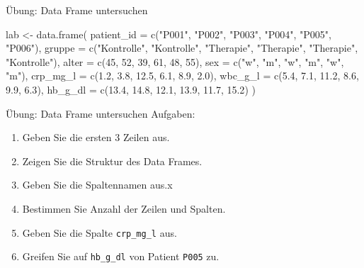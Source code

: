 \documentclass[
  10pt,
  ignorenonframetext,
  aspectratio=169,
]{beamer}
\newenvironment{Shaded}{}{}
\newcommand{\AttributeTok}[1]{\textcolor[rgb]{0.49,0.56,0.16}{#1}}
\newcommand{\DecValTok}[1]{\textcolor[rgb]{0.25,0.63,0.44}{#1}}
\newcommand{\FloatTok}[1]{\textcolor[rgb]{0.25,0.63,0.44}{#1}}
\newcommand{\FunctionTok}[1]{\textcolor[rgb]{0.02,0.16,0.49}{#1}}
\newcommand{\NormalTok}[1]{#1}
\newcommand{\OtherTok}[1]{\textcolor[rgb]{0.00,0.44,0.13}{#1}}
\newcommand{\StringTok}[1]{\textcolor[rgb]{0.25,0.44,0.63}{#1}}
\providecommand{\tightlist}{%
  \setlength{\itemsep}{0pt}\setlength{\parskip}{0pt}}
\begin{document}
\begin{frame}[fragile]{Übung: Data Frame untersuchen}
\label{uxfcbung-data-frame-untersuchen}
\begin{Shaded}
\begin{Highlighting}[]
\NormalTok{lab }\OtherTok{\textless{}{-}} \FunctionTok{data.frame}\NormalTok{(}
  \AttributeTok{patient\_id =} \FunctionTok{c}\NormalTok{(}\StringTok{"P001"}\NormalTok{, }\StringTok{"P002"}\NormalTok{, }\StringTok{"P003"}\NormalTok{, }\StringTok{"P004"}\NormalTok{, }\StringTok{"P005"}\NormalTok{, }\StringTok{"P006"}\NormalTok{),}
  \AttributeTok{gruppe     =} \FunctionTok{c}\NormalTok{(}\StringTok{"Kontrolle"}\NormalTok{, }\StringTok{"Kontrolle"}\NormalTok{, }\StringTok{"Therapie"}\NormalTok{, }\StringTok{"Therapie"}\NormalTok{, }\StringTok{"Therapie"}\NormalTok{, }\StringTok{"Kontrolle"}\NormalTok{),}
  \AttributeTok{alter      =} \FunctionTok{c}\NormalTok{(}\DecValTok{45}\NormalTok{, }\DecValTok{52}\NormalTok{, }\DecValTok{39}\NormalTok{, }\DecValTok{61}\NormalTok{, }\DecValTok{48}\NormalTok{, }\DecValTok{55}\NormalTok{),}
  \AttributeTok{sex        =} \FunctionTok{c}\NormalTok{(}\StringTok{"w"}\NormalTok{, }\StringTok{"m"}\NormalTok{, }\StringTok{"w"}\NormalTok{, }\StringTok{"m"}\NormalTok{, }\StringTok{"w"}\NormalTok{, }\StringTok{"m"}\NormalTok{),}
  \AttributeTok{crp\_mg\_l   =} \FunctionTok{c}\NormalTok{(}\FloatTok{1.2}\NormalTok{, }\FloatTok{3.8}\NormalTok{, }\FloatTok{12.5}\NormalTok{, }\FloatTok{6.1}\NormalTok{, }\FloatTok{8.9}\NormalTok{, }\FloatTok{2.0}\NormalTok{),}
  \AttributeTok{wbc\_g\_l    =} \FunctionTok{c}\NormalTok{(}\FloatTok{5.4}\NormalTok{, }\FloatTok{7.1}\NormalTok{, }\FloatTok{11.2}\NormalTok{, }\FloatTok{8.6}\NormalTok{, }\FloatTok{9.9}\NormalTok{, }\FloatTok{6.3}\NormalTok{),}
  \AttributeTok{hb\_g\_dl    =} \FunctionTok{c}\NormalTok{(}\FloatTok{13.4}\NormalTok{, }\FloatTok{14.8}\NormalTok{, }\FloatTok{12.1}\NormalTok{, }\FloatTok{13.9}\NormalTok{, }\FloatTok{11.7}\NormalTok{, }\FloatTok{15.2}\NormalTok{)}
\NormalTok{)}
\end{Highlighting}
\end{Shaded}
\end{frame}

\begin{frame}[fragile]{Übung: Data Frame untersuchen}
\label{uxfcbung-data-frame-untersuchen-1}
Aufgaben:

\begin{enumerate}
\tightlist
\item
  Geben Sie die ersten 3 Zeilen aus.
\item
  Zeigen Sie die Struktur des Data Frames.
\item
  Geben Sie die Spaltennamen aus.x
\item
  Bestimmen Sie Anzahl der Zeilen und Spalten.
\item
  Geben Sie die Spalte \texttt{crp\_mg\_l} aus.
\item
  Greifen Sie auf \texttt{hb\_g\_dl} von Patient \texttt{P005} zu.
\end{enumerate}
\end{frame}
\end{document}
